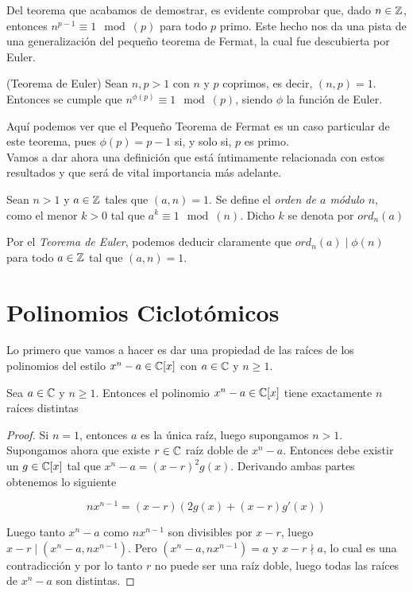 Del teorema que acabamos de demostrar, es evidente comprobar que, dado $n \in \mathbb{Z}$, entonces $n^{p-1} \equiv 1 \mod(p)$ para todo $p$ primo. Este hecho nos da una pista de una generalización del pequeño teorema de Fermat, la cual fue descubierta por Euler.

\begin{teorema}{(Teorema de Euler)}\label{teorema_de_euler}
	Sean $n, p > 1$ con $n$ y $p$ coprimos, es decir, $(n, p) = 1$. Entonces se cumple que $n^{\phi(p)} \equiv 1 \mod(p)$, siendo $\phi$ la función de Euler.
\end{teorema}

Aquí podemos ver que el Pequeño Teorema de Fermat es un caso particular de este teorema, pues $\phi(p) = p-1$ si, y solo si, $p$ es primo.\\

Vamos a dar ahora una definición que está íntimamente relacionada con estos resultados y que será de vital importancia más adelante.

\begin{definicion}
	Sean $n > 1$ y $a \in \mathbb{Z}$ tales que $(a, n) = 1$. Se define el \textit{orden de $a$ módulo $n$}, como el menor $k > 0$ tal que $a^k \equiv 1 \mod(n)$. Dicho $k$ se denota por $ord_n(a)$
\end{definicion}

Por el \textit{Teorema de Euler}, podemos deducir claramente que $ord_n(a) \mid \phi(n)$ para todo $a \in \mathbb{Z}$ tal que $(a, n) = 1$.

\section{Polinomios Ciclotómicos}

Lo primero que vamos a hacer es dar una propiedad de las raíces de los polinomios del estilo $x^n - a \in \mathbb{C}[x]$ con $a \in \mathbb{C}$ y $n \geq 1$.

\begin{lema}
	Sea $a \in \mathbb{C}$ y $n \geq 1$. Entonces el polinomio $x^n - a \in \mathbb{C}[x]$ tiene exactamente $n$ raíces distintas
\end{lema}

\begin{proof}
	Si $n = 1$, entonces $a$ es la única raíz, luego supongamos $n > 1$.\\
	
	Supongamos ahora que existe $r \in \mathbb{C}$ raíz doble de $x^n - a$. Entonces debe existir un $g \in \mathbb{C}[x]$ tal que $x^n - a = (x - r)^2g(x)$. Derivando ambas partes obtenemos lo siguiente
	
	\[ nx^{n-1} = (x - r)(2g(x) + (x - r)g'(x)) \]
	
	Luego tanto $x^n - a$ como $nx^{n-1}$ son divisibles por $x - r$, luego $x - r \mid (x^n - a, nx^{n-1})$. Pero $(x^n - a, nx^{n-1}) = a$ y $x - r \nmid a$, lo cual es una contradicción y por lo tanto $r$ no puede ser una raíz doble, luego todas las raíces de $x^n - a$ son distintas.
\end{proof}

